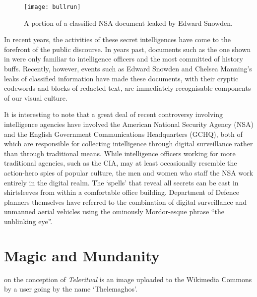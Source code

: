 \documentclass[a4paper,nobib]{tufte-handout}
\begin{document}
\begin{figure}
    \texttt{[image: bullrun]}
    \caption{A portion of a classified NSA document leaked by Edward Snowden.}
    \label{fig:bullrun}
\end{figure}
In recent years, the activities of these secret intelligences have come to the forefront of the public discourse. In years past, documents such as the one shown in  were only familiar to intelligence officers and the most committed of history buffs. Recently, however, events such as Edward Snowden and Chelsea Manning's leaks of classified information have made these documents, with their cryptic codewords and blocks of redacted text, are immediately recognisable components of our visual culture.

It is interesting to note that a great deal of recent controversy involving intelligence agencies have involved the American National Security Agency (NSA) and the English Government Communications Headquarters (GCHQ), both of which are responsible for collecting intelligence through digital surveillance rather than through traditional means. While intelligence officers working for more traditional agencies, such as the CIA, may at least occasionally resemble the action-hero spies of popular culture, the men and women who staff the NSA work entirely in the digital realm. The `spells' that reveal all secrets can be cast in shirtsleeves from within a comfortable office building. Department of Defence planners themselves have referred to the combination of digital surveillance and unmanned aerial vehicles using the ominously Mordor-esque phrase ``the unblinking eye''.\autocite[pp. 53]{odierno2008isr}

\section{Magic and Mundanity}


 on the conception of \emph{Teleritual} is an image uploaded to the Wikimedia Commons by a user going by the name `Thelemaghos'.
\end{document}

